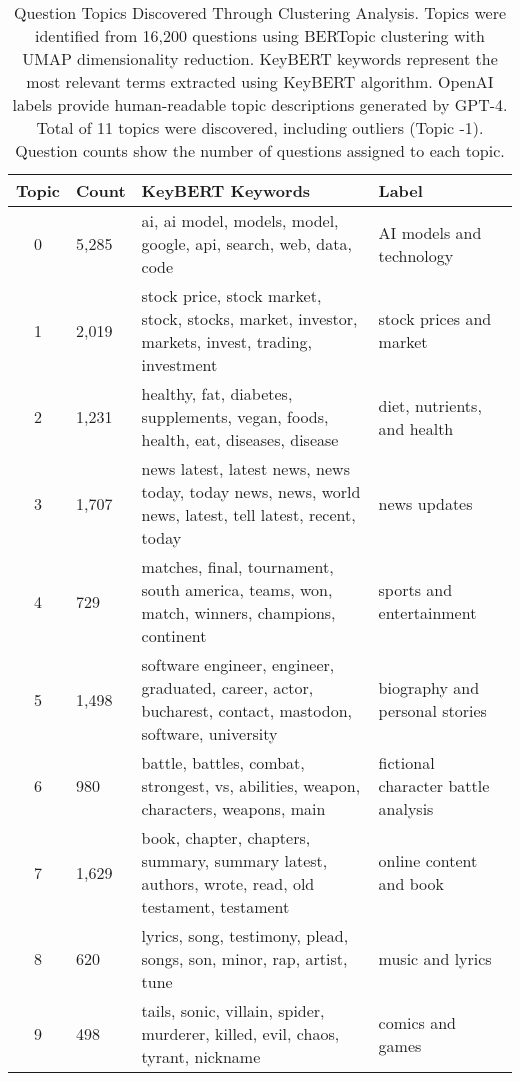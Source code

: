 \begin{table}[htbp]
\centering
\caption{Question Topics Discovered Through Clustering Analysis. Topics were identified from 16,200 questions using BERTopic clustering with UMAP dimensionality reduction. KeyBERT keywords represent the most relevant terms extracted using KeyBERT algorithm. OpenAI labels provide human-readable topic descriptions generated by GPT-4. Total of 11 topics were discovered, including outliers (Topic -1). Question counts show the number of questions assigned to each topic.}
\label{tab:question_topics}
\begin{tabular}{cp{3.5cm}p{4cm}p{6cm}}
\toprule
Topic & Count & KeyBERT Keywords & Label \\
\midrule
0 & 5,285 & ai, ai model, models, model, google, api, search, web, data, code & AI models and technology \\
1 & 2,019 & stock price, stock market, stock, stocks, market, investor, markets, invest, trading, investment & stock prices and market \\
2 & 1,231 & healthy, fat, diabetes, supplements, vegan, foods, health, eat, diseases, disease & diet, nutrients, and health \\
3 & 1,707 & news latest, latest news, news today, today news, news, world news, latest, tell latest, recent, today & news updates \\
4 & 729 & matches, final, tournament, south america, teams, won, match, winners, champions, continent & sports and entertainment \\
5 & 1,498 & software engineer, engineer, graduated, career, actor, bucharest, contact, mastodon, software, university & biography and personal stories \\
6 & 980 & battle, battles, combat, strongest, vs, abilities, weapon, characters, weapons, main & fictional character battle analysis \\
7 & 1,629 & book, chapter, chapters, summary, summary latest, authors, wrote, read, old testament, testament & online content and book \\
8 & 620 & lyrics, song, testimony, plead, songs, son, minor, rap, artist, tune & music and lyrics \\
9 & 498 & tails, sonic, villain, spider, murderer, killed, evil, chaos, tyrant, nickname & comics and games \\
\bottomrule
\end{tabular}
\end{table}